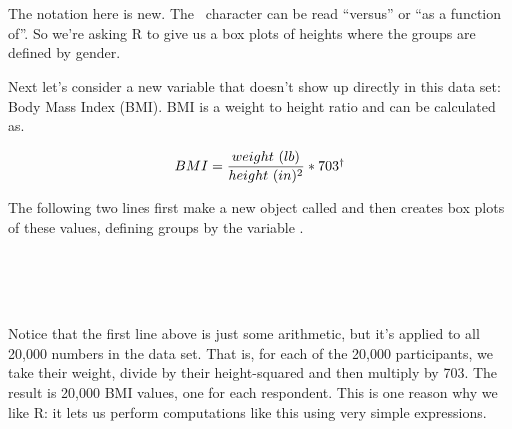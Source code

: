 \documentclass[11pt]{article}
\begin{document}
\ttfamily\noindent
\hlstd{}\hspace*{\fill}\\
\hlstd{}\hlkeyword{(}\hlkeyword{\usebox{\hlnormalsizeboxdollar}}\hlkeyword{\urltilda{}}{\ }\hlkeyword{\usebox{\hlnormalsizeboxdollar}}\hlkeyword{)}\hspace*{\fill}\\
\normalfont

The notation here is new. The \texttt{{\ }\hlkeyword{\urltilda{}}{\ }}character can be read ``versus'' or ``as a function of''. So we're asking R to give us a box plots of heights where the groups are defined by gender. 

Next let's consider a new variable that doesn't show up directly in this data set: Body Mass Index (BMI). BMI is a weight to height ratio and can be calculated as.

\[ BMI = \frac{weight~(lb)}{height~(in)^2} * 703\symbolfootnote[2]{703 is the approximate conversion factor to change units from metric (meters and kilograms) to imperial (inches and pounds)} \]

The following two lines first make a new object called \texttt{} and then creates box plots of these values, defining groups by the variable \texttt{\hlkeyword{\usebox{\hlnormalsizeboxdollar}}}.

\ttfamily\noindent
\hlstd{}\hspace*{\fill}\\
\hlstd{}\hlassignement{\usebox{\hlnormalsizeboxlessthan}-}{\ }\hlkeyword{(}\hlkeyword{\usebox{\hlnormalsizeboxdollar}}\hlkeyword{/}{\ }\hlkeyword{\usebox{\hlnormalsizeboxdollar}}\hlkeyword{\usebox{\hlnormalsizeboxhat}}\hlkeyword{)}{\ }\hlkeyword{*}{\ }\hspace*{\fill}\\
\hlstd{}\hlkeyword{(}\hlkeyword{\urltilda{}}{\ }\hlkeyword{\usebox{\hlnormalsizeboxdollar}}\hlkeyword{)}\hspace*{\fill}\\
\normalfont

Notice that the first line above is just some arithmetic, but it's applied to all 20,000 numbers in the \texttt{} data set. That is, for each of the 20,000 participants, we take their weight, divide by their height-squared and then multiply by 703. The result is 20,000 BMI values, one for each respondent. This is one reason why we like R: it lets us perform computations like this using very simple expressions.
\end{document}
